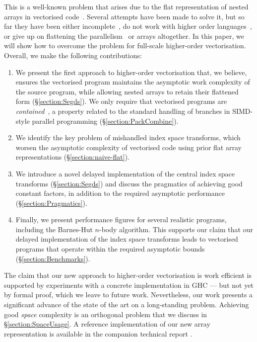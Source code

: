 This is a well-known problem that arises due to the flat representation of nested arrays in vectorised code~\cite[Appendix~C]{Blelloch:nesl-3_1}. Several attempts have been made to solve it, but so far they have been either incomplete~\cite{Palmer:work-efficient-nested-data-parallelism}, do not work with higher order languages~\cite{Hill:vectorising}, or give up on flattening the parallelism~\cite{Blelloch:provable-type-and-space-efficient, Fluet:2008:Manticore} or arrays \cite{Riely:flattening-improvement} altogether. In this paper, we will show how to overcome the problem for full-scale higher-order vectorisation.
Overall, we make the following contributions: 
%
\begin{enumerate}
\item   We present the first approach to higher-order vectorisation that, we believe, ensures the vectorised program maintains the asymptotic work complexity of the source program, while allowing nested arrays to retain their flattened form (\S\ref{section:Segds}). We only require that vectorised programs are \emph{contained}~\cite{Blelloch:vector-models, Riely:flattening-improvement}, a property related to the standard handling of branches in SIMD-style parallel programming (\S\ref{section:PackCombine}).

\item   We identify the key problem of mishandled index space transforms, which worsen the asymptotic complexity of vectorised code using prior flat array representations (\S\ref{section:naive-flat}).

\item   We introduce a novel delayed implementation of the central index space transforms (\S\ref{section:Segds}) and discuss the pragmatics of achieving good constant factors, in addition to the required asymptotic performance (\S\ref{section:Pragmatics}).

\item Finally, we present performance figures for several realistic programs, including the Barnes-Hut $n$-body algorithm. This supports our claim that our delayed implementation of the index space transforms leads to vectorised programs that operate within the required asymptotic bounds (\S\ref{section:Benchmarks}).
\end{enumerate}
%
The claim that our new approach to higher-order vectorisation is work efficient is supported by experiments with a concrete implementation in GHC --- but not yet by formal proof, which we leave to future work. Nevertheless, our work presents a significant advance of the state of the art on a long-standing problem. Achieving good \emph{space} complexity is an orthogonal problem that we discuss in \S\ref{section:SpaceUsage}. A reference implementation of our new array representation is available in the companion technical report \cite{lippmeier-etal:replicate-tr}.
